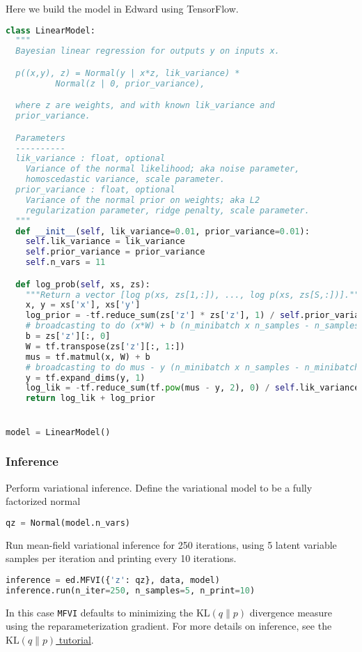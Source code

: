 Here we build the model in Edward using TensorFlow.
\begin{lstlisting}[language=Python]
class LinearModel:
  """
  Bayesian linear regression for outputs y on inputs x.

  p((x,y), z) = Normal(y | x*z, lik_variance) *
          Normal(z | 0, prior_variance),

  where z are weights, and with known lik_variance and
  prior_variance.

  Parameters
  ----------
  lik_variance : float, optional
    Variance of the normal likelihood; aka noise parameter,
    homoscedastic variance, scale parameter.
  prior_variance : float, optional
    Variance of the normal prior on weights; aka L2
    regularization parameter, ridge penalty, scale parameter.
  """
  def __init__(self, lik_variance=0.01, prior_variance=0.01):
    self.lik_variance = lik_variance
    self.prior_variance = prior_variance
    self.n_vars = 11

  def log_prob(self, xs, zs):
    """Return a vector [log p(xs, zs[1,:]), ..., log p(xs, zs[S,:])]."""
    x, y = xs['x'], xs['y']
    log_prior = -tf.reduce_sum(zs['z'] * zs['z'], 1) / self.prior_variance
    # broadcasting to do (x*W) + b (n_minibatch x n_samples - n_samples)
    b = zs['z'][:, 0]
    W = tf.transpose(zs['z'][:, 1:])
    mus = tf.matmul(x, W) + b
    # broadcasting to do mus - y (n_minibatch x n_samples - n_minibatch x 1)
    y = tf.expand_dims(y, 1)
    log_lik = -tf.reduce_sum(tf.pow(mus - y, 2), 0) / self.lik_variance
    return log_lik + log_prior


model = LinearModel()
\end{lstlisting}


\subsubsection{Inference}

Perform variational inference.
Define the variational model to be a fully factorized normal
\begin{lstlisting}[language=Python]
qz = Normal(model.n_vars)
\end{lstlisting}

Run mean-field variational inference for 250 iterations, using 5
latent variable samples per iteration and printing
every 10 iterations.
\begin{lstlisting}[language=Python]
inference = ed.MFVI({'z': qz}, data, model)
inference.run(n_iter=250, n_samples=5, n_print=10)
\end{lstlisting}
In this case \texttt{MFVI} defaults to minimizing the
$\text{KL}(q\|p)$ divergence measure using the reparameterization
gradient.
For more details on inference, see the \href{tut_KLqp}{$\text{KL}(q\|p)$ tutorial}.


